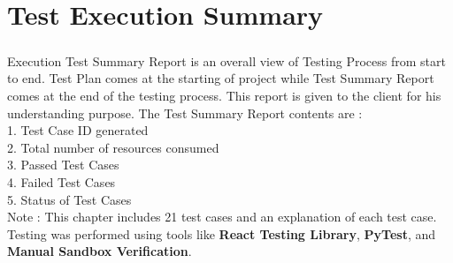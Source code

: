 \chapter{Test Execution Summary}

\paragraph{}Execution Test Summary Report is an overall view of Testing Process from start to end. Test Plan comes at the starting of project while Test Summary Report comes at the end of the testing process. This report is given to the client for his understanding purpose. 
The Test Summary Report contents are :\\
1. Test Case ID generated \\
2. Total number of resources consumed \\
3. Passed Test Cases \\
4. Failed Test Cases \\
5. Status of Test Cases \\

Note : This chapter includes 21 test cases and an explanation of each test case. Testing was performed using tools like \textbf{React Testing Library}, \textbf{PyTest}, and \textbf{Manual Sandbox Verification}.

